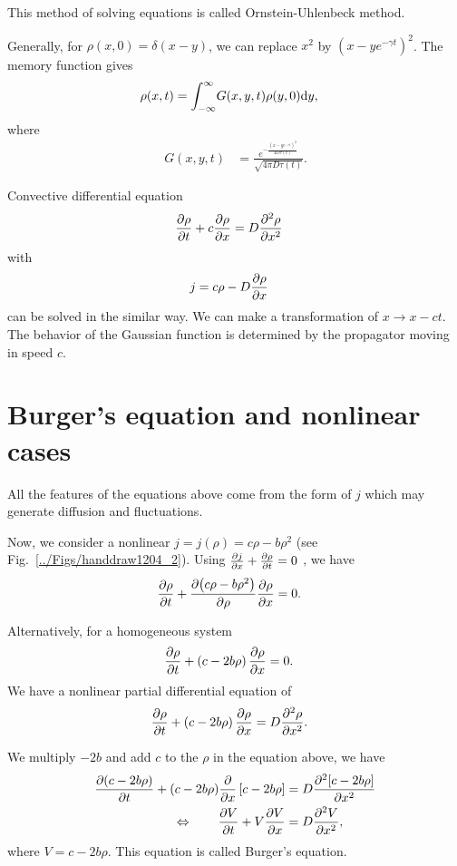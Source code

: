 This method of solving equations is called Ornstein-Uhlenbeck method. 

Generally, for $ \rho(x,0)=\delta(x-y) $, we can replace $ x^2 $ by $(x-ye^{-\gamma t})^2$. The memory function gives
\begin{align}
\rho(x,t) &= \int_{-\infty}^\infty\! G(x,y,t)\rho(y,0) \mathrm{d}y,
\end{align}
where
\begin{align}
G(x,y,t) &= \frac{e^{-\frac{(x-ye^{-\gamma t})^2}{4D\tau(t)}}}{\sqrt{4\pi D \tau (t)}}.
\end{align}


Convective differential equation 
\begin{align}
\frac{\partial {\rho}}{\partial t} + c \frac{\partial {\rho}}{\partial x} &= D \frac{\partial^2 {\rho}}{\partial x^2}
\end{align}
with \begin{align}
j &= c\rho -D \frac{\partial {\rho}}{\partial x}
\end{align}
can be solved in the similar way. We can make a transformation of $ x \rightarrow x- ct $. The behavior of the Gaussian function is determined by the propagator moving in speed $ c $. 


\section{Burger's equation and nonlinear cases}
All the features of the equations above come from the form of $ j $ which may generate diffusion and fluctuations. 

Now, we consider a nonlinear $ j=j(\rho) = c\rho -b\rho^2$ (see Fig.~\ref{../Figs/handdraw1204_2}). Using $ \frac{\partial {j}}{\partial x} + \frac{\partial {\rho}}{\partial t}=0 $ , we have
\begin{align}
\frac{\partial {\rho}}{\partial t} + \frac{\partial {\left( c\rho -b\rho^2 \right)}}{\partial {\rho}} \frac{\partial {\rho}}{\partial x} &= 0.
\end{align}

Alternatively, for a homogeneous system
\begin{align}
\frac{\partial {\rho}}{\partial t} + \left( c-2b\rho \right) \frac{\partial {\rho}}{\partial x} &=0.
\end{align}
We have a nonlinear partial differential equation of
\begin{align}
\frac{\partial {\rho}}{\partial t} + \left( c-2b\rho \right) \frac{\partial {\rho}}{\partial x} &= D \frac{\partial^2 {\rho}}{\partial x^2}.
\end{align}

We multiply $ -2b $ and add $ c $ to the $ \rho $ in the equation above, we have
\begin{align}
\frac{\partial {(c-2b \rho)}}{\partial t} + (c- 2b\rho ) \frac{\partial {}}{\partial x}\left[ c-2b\rho \right] &= D\frac{\partial^2 {\left[c-2b\rho\right]}}{\partial x^2}\\
\Leftrightarrow\qquad  \frac{\partial {V}}{\partial t} + V \frac{\partial {V}}{\partial x} &= D\frac{\partial^2 {V}}{\partial x^2},
\end{align}
where $ V= c- 2b\rho $. This equation is called Burger's equation. 


